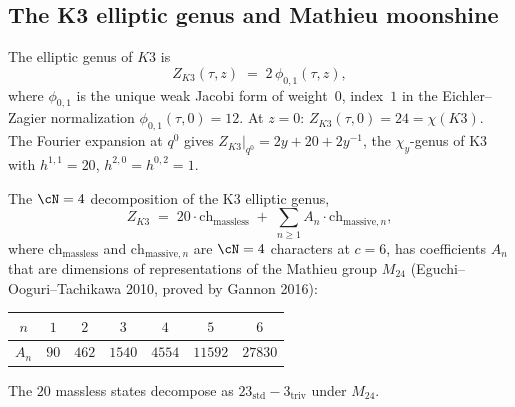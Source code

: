 \subsection{The K3 elliptic genus and Mathieu moonshine}
\label{subsec:k3-elliptic-genus}

\begin{definition}
\label{def:k3-elliptic-genus}
The elliptic genus of $K3$ is
\begin{equation}\label{eq:k3-elliptic-genus}
Z_{K3}(\tau,z) \;=\; 2\,\phi_{0,1}(\tau,z),
\end{equation}
where $\phi_{0,1}$ is the unique weak Jacobi form of weight~$0$,
index~$1$ in the Eichler--Zagier normalization
$\phi_{0,1}(\tau,0) = 12$. At $z = 0$:
$Z_{K3}(\tau,0) = 24 = \chi(K3)$.
The Fourier expansion at $q^0$ gives
$Z_{K3}|_{q^0} = 2y + 20 + 2y^{-1}$,
the $\chi_y$-genus of K3 with $h^{1,1} = 20$,
$h^{2,0} = h^{0,2} = 1$.
\end{definition}

\begin{theorem}
\label{thm:mathieu-moonshine}
The $\cN = 4$ decomposition of the K3 elliptic genus,
\begin{equation}\label{eq:mathieu-decomposition}
Z_{K3} \;=\; 20 \cdot \mathrm{ch}_{\mathrm{massless}}
\;+\; \sum_{n \geq 1} A_n \cdot \mathrm{ch}_{\mathrm{massive},n},
\end{equation}
where $\mathrm{ch}_{\mathrm{massless}}$ and
$\mathrm{ch}_{\mathrm{massive},n}$ are $\cN = 4$ characters at
$c = 6$, has coefficients $A_n$ that are dimensions of
representations of the Mathieu group $M_{24}$
\textup{(}Eguchi--Ooguri--Tachikawa 2010, proved by Gannon
2016\textup{)}:
\begin{center}
\small
\renewcommand{\arraystretch}{1.2}
\begin{tabular}{ccccccc}
$n$ & $1$ & $2$ & $3$ & $4$ & $5$ & $6$ \\
\hline
$A_n$ & $90$ & $462$ & $1540$ & $4554$ & $11592$ & $27830$
\end{tabular}
\end{center}
The $20$ massless states decompose as
$23_{\mathrm{std}} - 3_{\mathrm{triv}}$ under $M_{24}$.
\end{theorem}

